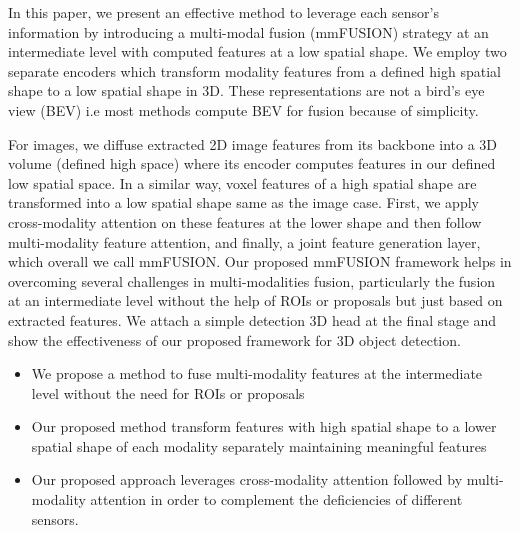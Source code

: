 \documentclass[10pt,twocolumn,letterpaper]{article}
\begin{document}


In this paper, we present an effective method to leverage each sensor's information by introducing a multi-modal fusion (mmFUSION) strategy at an intermediate level with computed features at a low spatial shape. We employ two separate encoders which transform modality features from a defined high spatial shape to a low spatial shape in 3D. These representations are not a bird's eye view (BEV) i.e most methods compute BEV for fusion because of simplicity. 

For images, we diffuse extracted 2D image features from its backbone into a 3D volume (defined high space) where its encoder computes features in our defined low spatial space. In a similar way, voxel features of a high spatial shape are transformed into a low spatial shape same as the image case. First, we apply cross-modality attention on these features at the lower shape and then follow multi-modality feature attention, and finally, a joint feature generation layer, which overall we call mmFUSION. Our proposed mmFUSION framework helps in overcoming several challenges in multi-modalities fusion, particularly the fusion at an intermediate level without the help of ROIs or proposals but just based on extracted features. We attach a simple detection 3D head at the final stage and show the effectiveness of our proposed framework for 3D object detection.

\begin{itemize}
    \item We propose a method to fuse multi-modality features at the intermediate level without the need for ROIs or proposals
    \item Our proposed method transform features with high spatial shape to a lower spatial shape of each modality separately maintaining meaningful features
    \item Our proposed approach leverages cross-modality attention followed by multi-modality attention in order to complement the deficiencies of different sensors.
\end{itemize}
\end{document}
